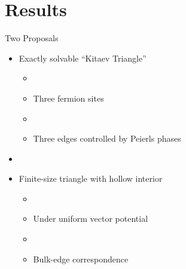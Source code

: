 \documentclass[xcolor=dvipsnames,10pt,aspectratio=169]{beamer}
\newcommand{\RE}{Results}
\begin{document}
  \section{\RE}

  \begin{frame}{Two Proposals}
    \begin{itemize}
      \item Exactly solvable ``Kitaev Triangle''
        \begin{itemize}
          \item[]
          \item Three fermion sites
          \item[]
          \item Three edges controlled by Peierls phases
        \end{itemize}
      \item[]
      \pause
      \item Finite-size triangle with hollow interior
        \begin{itemize}
          \item[]
          \item Under uniform vector potential
          \item[]
          \item Bulk-edge correspondence
        \end{itemize}
    \end{itemize}
  \end{frame}
\end{document}
